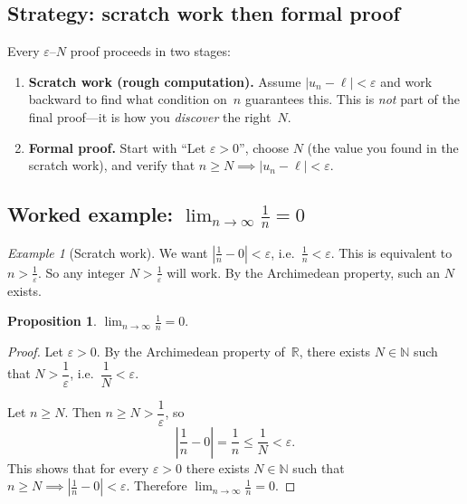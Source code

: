 \documentclass[12pt,a4paper,openany]{book}
\newcommand{\N}{\mathbb{N}}
\newcommand{\R}{\mathbb{R}}
\newcommand{\eps}{\varepsilon}
\newcommand{\abs}[1]{\left\lvert #1 \right\rvert}
\theoremstyle{definition}
\newtheorem{proposition}{Proposition}[chapter]
\theoremstyle{remark}
\newtheorem{example}{Example}[chapter]
\begin{document}
\subsection{Strategy: scratch work then formal proof}

Every $\eps$--$N$ proof proceeds in two stages:

\begin{enumerate}
\item \textbf{Scratch work (rough computation).}  Assume $\abs{u_n - \ell} < \eps$
      and work backward to find what condition on~$n$ guarantees this.  This
      is \emph{not} part of the final proof---it is how you \emph{discover} the
      right~$N$.
\item \textbf{Formal proof.}  Start with ``Let $\eps > 0$'', choose $N$
      (the value you found in the scratch work), and verify that
      $n \geq N \implies \abs{u_n - \ell} < \eps$.
\end{enumerate}

\subsection{Worked example: $\lim_{n\to\infty}\frac{1}{n} = 0$}
\label{sec:ex-1-over-n}

\begin{example}[Scratch work]\label{ex:1n-scratch}
We want $\abs{\frac{1}{n} - 0} < \eps$, i.e.\ $\frac{1}{n} < \eps$.
This is equivalent to $n > \frac{1}{\eps}$.
So any integer $N > \frac{1}{\eps}$ will work. By the Archimedean property,
such an $N$ exists.
\end{example}

\begin{proposition}\label{prop:lim-1-over-n}
$\displaystyle \lim_{n\to\infty}\frac{1}{n} = 0$.
\end{proposition}

\begin{proof}
Let $\eps > 0$. By the Archimedean property of~$\R$, there exists
$N \in \N$ such that $N > \dfrac{1}{\eps}$, i.e.\ $\dfrac{1}{N} < \eps$.

Let $n \geq N$. Then $n \geq N > \dfrac{1}{\eps}$, so
\[
   \abs{\frac{1}{n} - 0}
   = \frac{1}{n}
   \leq \frac{1}{N}
   < \eps.
\]
This shows that for every $\eps > 0$ there exists $N \in \N$ such that
$n \geq N \implies \abs{\frac{1}{n} - 0} < \eps$. Therefore
$\lim_{n\to\infty}\frac{1}{n} = 0$.
\end{proof}
\end{document}
